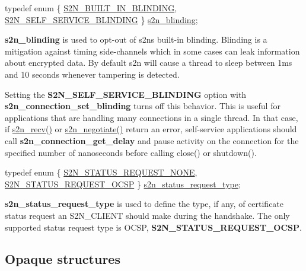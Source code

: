 \begin{DoxyCode}
\textcolor{keyword}{typedef} \textcolor{keyword}{enum} \{ \hyperlink{s2n_8h_a364ad496c9dd42fd3117a2f9d3289e62a090459f0733b199be908d881d7db871f}{S2N\_BUILT\_IN\_BLINDING}, 
      \hyperlink{s2n_8h_a364ad496c9dd42fd3117a2f9d3289e62a1b0ee228485be6bb2d6e2129827d51d2}{S2N\_SELF\_SERVICE\_BLINDING} \} \hyperlink{s2n_8h_a364ad496c9dd42fd3117a2f9d3289e62}{s2n\_blinding};
\end{DoxyCode}


{\bfseries s2n\+\_\+blinding} is used to opt-\/out of s2n\textquotesingle{}s built-\/in blinding. Blinding is a mitigation against timing side-\/channels which in some cases can leak information about encrypted data. By default s2n will cause a thread to sleep between 1ms and 10 seconds whenever tampering is detected.

Setting the {\bfseries S2\+N\+\_\+\+S\+E\+L\+F\+\_\+\+S\+E\+R\+V\+I\+C\+E\+\_\+\+B\+L\+I\+N\+D\+I\+NG} option with {\bfseries s2n\+\_\+connection\+\_\+set\+\_\+blinding} turns off this behavior. This is useful for applications that are handling many connections in a single thread. In that case, if \hyperlink{s2n_8h_afede11e597a4db3024ec2b68733a643d}{s2n\+\_\+recv()} or \hyperlink{s2n_8h_a309d98d4c1adfd10c5dd62192f4c1051}{s2n\+\_\+negotiate()} return an error, self-\/service applications should call {\bfseries s2n\+\_\+connection\+\_\+get\+\_\+delay} and pause activity on the connection for the specified number of nanoseconds before calling close() or shutdown().


\begin{DoxyCode}
\textcolor{keyword}{typedef} \textcolor{keyword}{enum} \{ \hyperlink{s2n_8h_a7d38e45340d223d0100a2d4bc0526635aea0f05b257857adc1282f77c5414e35a}{S2N\_STATUS\_REQUEST\_NONE}, 
      \hyperlink{s2n_8h_a7d38e45340d223d0100a2d4bc0526635a3e83f0e90eef54adc21b3d97a9a0d9b8}{S2N\_STATUS\_REQUEST\_OCSP} \} \hyperlink{s2n_8h_a7d38e45340d223d0100a2d4bc0526635}{s2n\_status\_request\_type};
\end{DoxyCode}


{\bfseries s2n\+\_\+status\+\_\+request\+\_\+type} is used to define the type, if any, of certificate status request an S2\+N\+\_\+\+C\+L\+I\+E\+NT should make during the handshake. The only supported status request type is O\+C\+SP, {\bfseries S2\+N\+\_\+\+S\+T\+A\+T\+U\+S\+\_\+\+R\+E\+Q\+U\+E\+S\+T\+\_\+\+O\+C\+SP}.

\subsection*{Opaque structures}

